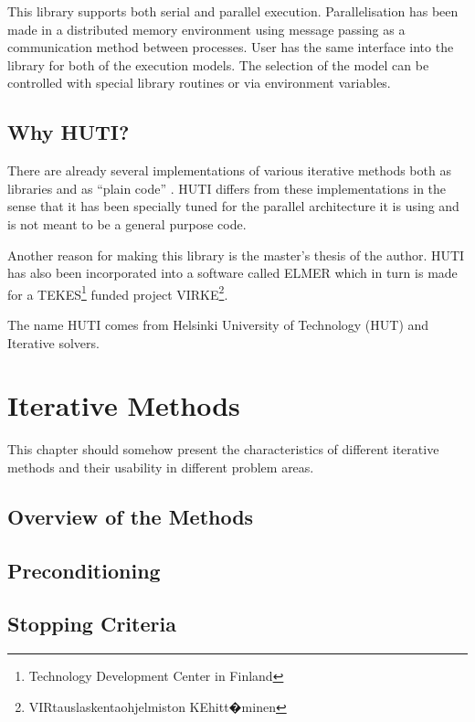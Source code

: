\documentclass[11pt,a4paper,english,oneside]{report}
\begin{document}
This library supports both serial and parallel execution. Parallelisation
has been made in a distributed memory environment using message passing
as a communication method between processes. User has the same interface
into the library for both of the execution models. The selection of the
model can be controlled with special library routines or via environment
variables.

\section{Why HUTI?}

There are already several implementations of various iterative
methods both as libraries and as ``plain code''
\cite{Cun95,Bal95,Saa95,Fre96}.
HUTI differs from these implementations in the sense that it has been
specially tuned for the parallel architecture it is using and is
not meant to be a general purpose code.

Another reason for making this library is the
master's thesis of the author. HUTI has also been incorporated into
a software called ELMER which in turn is made for a
TEKES\footnote{Technology Development Center in Finland}
funded project VIRKE\footnote{VIRtauslaskentaohjelmiston KEhitt�minen}.

The name HUTI comes from Helsinki University of Technology (HUT) and
Iterative solvers.


\chapter{Iterative Methods}
\label{ch:methods}

This chapter should somehow present the characteristics of different
iterative methods and their usability in different problem areas.

\section{Overview of the Methods}
\section{Preconditioning}
\section{Stopping Criteria}
\end{document}
